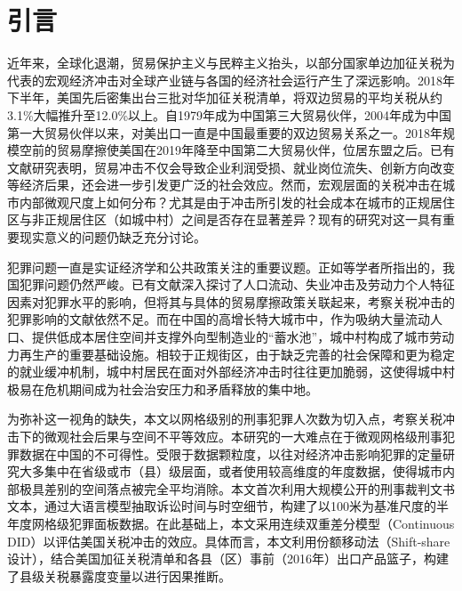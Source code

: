\documentclass[a4paper,12pt]{report}
\begin{document}
\chapter{引言}

近年来，全球化退潮，贸易保护主义与民粹主义抬头，以部分国家单边加征关税为代表的宏观经济冲击对全球产业链与各国的经济社会运行产生了深远影响。2018年下半年，美国先后密集出台三批对华加征关税清单，将双边贸易的平均关税从约3.1\%大幅推升至12.0\%以上\citep{bown2021trade}。自1979年成为中国第三大贸易伙伴，2004年成为中国第一大贸易伙伴以来，对美出口一直是中国最重要的双边贸易关系之一。2018年规模空前的贸易摩擦使美国在2019年降至中国第二大贸易伙伴，位居东盟之后。已有文献研究表明，贸易冲击不仅会导致企业利润受损、就业岗位流失、创新方向改变等经济后果\citep{amiti2019impact, fajgelbaum2020return,ma2025market}，还会进一步引发更广泛的社会效应。然而，宏观层面的关税冲击在城市内部微观尺度上如何分布？尤其是由于冲击所引发的社会成本在城市的正规居住区与非正规居住区（如城中村）之间是否存在显著差异？现有的研究对这一具有重要现实意义的问题仍缺乏充分讨论。

犯罪问题一直是实证经济学和公共政策关注的重要议题。正如\textcite{yi2023povertycrime}等学者所指出的，我国犯罪问题仍然严峻。已有文献深入探讨了人口流动\citep{zhang2018minimum}、失业冲击\citep{zhang2011unemployment,doyle1999effects}及劳动力个人特征因素对犯罪水平的影响，但将其与具体的贸易摩擦政策关联起来，考察关税冲击的犯罪影响的文献依然不足。而在中国的高增长特大城市中，作为吸纳大量流动人口、提供低成本居住空间并支撑外向型制造业的“蓄水池”，城中村构成了城市劳动力再生产的重要基础设施\citep{wang2009urbanization}。相较于正规街区，由于缺乏完善的社会保障和更为稳定的就业缓冲机制，城中村居民在面对外部经济冲击时往往更加脆弱，这使得城中村极易在危机期间成为社会治安压力和矛盾释放的集中地。

为弥补这一视角的缺失，本文以网格级别的刑事犯罪人次数为切入点，考察关税冲击下的微观社会后果与空间不平等效应。本研究的一大难点在于微观网格级刑事犯罪数据在中国的不可得性。受限于数据颗粒度，以往对经济冲击影响犯罪的定量研究大多集中在省级或市（县）级层面\citep{chen2009income,lu2011inequality}，或者使用较高维度的年度数据，使得城市内部极具差别的空间落点被完全平均消除。本文首次利用大规模公开的刑事裁判文书文本，通过大语言模型抽取诉讼时间与时空细节，构建了以100米为基准尺度的半年度网格级犯罪面板数据。在此基础上，本文采用连续双重差分模型（Continuous DID）以评估美国关税冲击的效应。具体而言，本文利用份额移动法（Shift-share设计），结合美国加征关税清单和各县（区）事前（2016年）出口产品篮子，构建了县级关税暴露度变量以进行因果推断。
\end{document}
